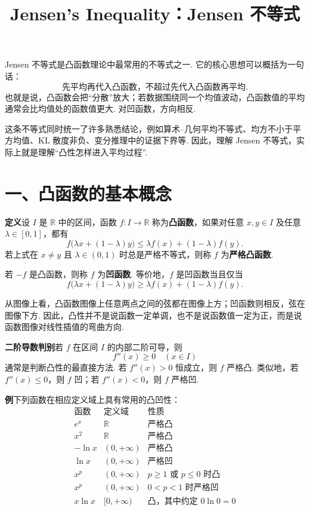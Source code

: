 \documentclass[UTF8,12pt,a4paper,fontset=fandol]{ctexart}
\title{Jensen's Inequality：Jensen 不等式}
\author{}
\date{}
\begin{document}
\maketitle

Jensen 不等式是凸函数理论中最常用的不等式之一. 它的核心思想可以概括为一句话：
\[
  \text{先平均再代入凸函数，不超过先代入凸函数再平均.}
\]
也就是说，凸函数会把``分散''放大；若数据围绕同一个均值波动，凸函数值的平均通常会比均值处的函数值更大. 对凹函数，方向相反.

这条不等式同时统一了许多熟悉结论，例如算术--几何平均不等式、均方不小于平方均值、KL 散度非负、变分推理中的证据下界等. 因此，理解 Jensen 不等式，实际上就是理解``凸性怎样进入平均过程''.

\section*{一、凸函数的基本概念}

\noindent\textbf{定义}\quad 设 $I$ 是 $\mathbb R$ 中的区间，函数 $f:I\to\mathbb R$ 称为\textbf{凸函数}，如果对任意 $x,y\in I$ 及任意 $\lambda\in[0,1]$，都有
\[
  f\bigl(\lambda x+(1-\lambda)y\bigr)
  \le
  \lambda f(x)+(1-\lambda)f(y).
\]
若上式在 $x\ne y$ 且 $\lambda\in(0,1)$ 时总是严格不等式，则称 $f$ 为\textbf{严格凸函数}.

若 $-f$ 是凸函数，则称 $f$ 为\textbf{凹函数}. 等价地，$f$ 是凹函数当且仅当
\[
  f\bigl(\lambda x+(1-\lambda)y\bigr)
  \ge
  \lambda f(x)+(1-\lambda)f(y).
\]

从图像上看，凸函数图像上任意两点之间的弦都在图像上方；凹函数则相反，弦在图像下方. 因此，凸性并不是说函数一定单调，也不是说函数值一定为正，而是说函数图像对线性插值的弯曲方向.

\noindent\textbf{二阶导数判别}\quad 若 $f$ 在区间 $I$ 的内部二阶可导，则
\[
  f''(x)\ge0\quad(x\in I)
\]
通常是判断凸性的最直接方法. 若 $f''(x)>0$ 恒成立，则 $f$ 严格凸. 类似地，若 $f''(x)\le0$，则 $f$ 凹；若 $f''(x)<0$，则 $f$ 严格凹.

\noindent\textbf{例}\quad 下列函数在相应定义域上具有常用的凸凹性：
\[
\begin{array}{c|c|c}
  \text{函数} & \text{定义域} & \text{性质}\\ \hline
  e^x & \mathbb R & \text{严格凸}\\
  x^2 & \mathbb R & \text{严格凸}\\
  -\ln x & (0,+\infty) & \text{严格凸}\\
  \ln x & (0,+\infty) & \text{严格凹}\\
  x^p & (0,+\infty) & p\ge1\text{ 或 }p\le0\text{ 时凸}\\
  x^p & (0,+\infty) & 0<p<1\text{ 时严格凹}\\
  x\ln x & [0,+\infty) & \text{凸，其中约定 }0\ln0=0
\end{array}
\]
\end{document}
